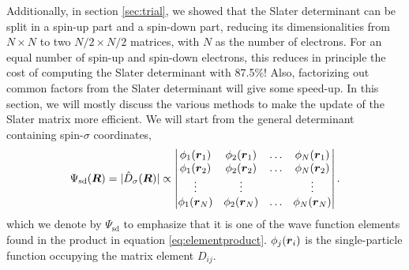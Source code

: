 Additionally, in section \ref{sec:trial}, we showed that the Slater determinant can be split in a spin-up part and a spin-down part, reducing its dimensionalities from $N\times N$ to two $N/2\times N/2$ matrices, with $N$ as the number of electrons. For an equal number of spin-up and spin-down electrons, this reduces in principle the cost of computing the Slater determinant with 87.5\%! Also, factorizing out common factors from the Slater determinant will give some speed-up. In this section, we will mostly discuss the various methods to make the update of the Slater matrix more efficient. We will start from the general determinant containing spin-$\sigma$ coordinates,
\begin{equation}
\Psi_{\text{sd}}(\boldsymbol{{R}})=|\hat{D}_{\sigma}(\boldsymbol{{R}})|\propto
\begin{vmatrix}
\phi_1(\boldsymbol{r}_1) & \phi_2(\boldsymbol{r}_1) & \hdots & \phi_{N}(\boldsymbol{r}_1)\\
\phi_1(\boldsymbol{r}_2) & \phi_2(\boldsymbol{r}_2) & \hdots & \phi_{N}(\boldsymbol{r}_2)\\
\vdots & \vdots & & \vdots \\
\phi_1(\boldsymbol{r}_{N}) & \phi_2(\boldsymbol{r}_{N}) & \hdots & \phi_{N}(\boldsymbol{r}_{N})
\end{vmatrix}.
\end{equation}
which we denote by $\Psi_{\text{sd}}$ to emphasize that it is one of the wave function elements found in the product in equation \eqref{eq:elementproduct}. 
$\phi_j(\boldsymbol{{r}}_i)$ is the single-particle function occupying the matrix element $D_{ij}$.



